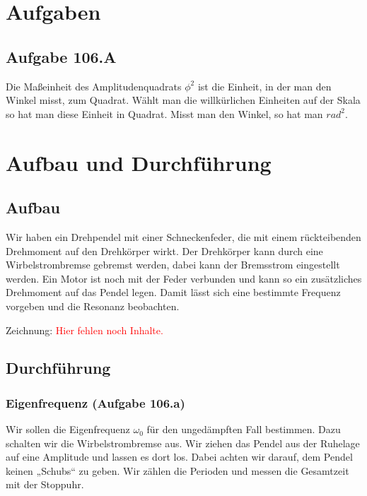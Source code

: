 \documentclass[11pt]{article}
\newcommand{\fehlt}{\textcolor{red}{Hier fehlen noch Inhalte.}}
\begin{document}
\section{Aufgaben}

\subsection{Aufgabe 106.A}

Die Maßeinheit des Amplitudenquadrats $\phi^2$ ist die Einheit, in der man den
Winkel misst, zum Quadrat. Wählt man die willkürlichen Einheiten auf der Skala
so hat man diese Einheit in Quadrat. Misst man den Winkel, so hat man
$\unit{rad}^2$.

\section{Aufbau und Durchführung}

\subsection{Aufbau}

Wir haben ein Drehpendel mit einer Schneckenfeder, die mit einem rückteibenden
Drehmoment auf den Drehkörper wirkt. Der Drehkörper kann durch eine
Wirbelstrombremse gebremst werden, dabei kann der Bremsstrom eingestellt
werden. Ein Motor ist noch mit der Feder verbunden und kann so ein zusätzliches
Drehmoment auf das Pendel legen. Damit lässt sich eine bestimmte Frequenz
vorgeben und die Resonanz beobachten.

Zeichnung: \fehlt


\subsection{Durchführung}

\subsubsection{Eigenfrequenz (Aufgabe 106.a)}
\label{a_durchführung}

Wir sollen die Eigenfrequenz $\omega_0$  für den ungedämpften Fall bestimmen.
Dazu schalten wir die Wirbelstrombremse aus. Wir ziehen das Pendel aus der
Ruhelage auf eine Amplitude und lassen es dort los. Dabei achten wir darauf,
dem Pendel keinen „Schubs“ zu geben. Wir zählen die Perioden und messen die
Gesamtzeit mit der Stoppuhr.
\end{document}
